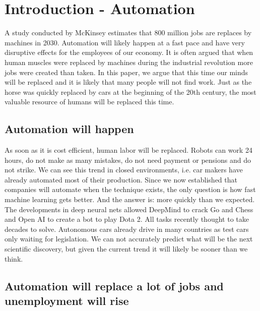 \documentclass[conference]{IEEEtran}
\begin{document}
\section{Introduction - Automation}
%
A study conducted by McKinsey \cite{AutomationMcKinsey} estimates that 800 million jobs are replaces by machines in 2030. Automation will likely happen at a fast pace and have very disruptive effects for the employees of our economy. It is often argued that when human muscles were replaced by machines during the industrial revolution more jobs were created than taken. In this paper, we argue that this time our minds will be replaced and it is likely that many people will not find work. Just as the horse was quickly replaced by cars at the beginning of the 20th century, the most valuable resource of humans will be replaced this time. 

\subsection{Automation will happen}

As soon as it is cost efficient, human labor will be replaced. Robots can work 24 hours, do not make as many mistakes, do not need payment or pensions and do not strike. We can see this trend in closed environments, i.e. car makers have already automated most of their production. Since we now established that companies will automate when the technique exists, the only question is how fast machine learning gets better. And the answer is: more quickly than we expected. The developments in deep neural nets allowed DeepMind to crack Go and Chess and Open AI to create a bot to play Dota 2. All tasks recently thought to take decades to solve. Autonomous cars already drive in many countries as test cars only waiting for legislation. We can not accurately predict what will be the next scientific discovery, but given the current trend it will likely be sooner than we think. 

\subsection{Automation will replace a lot of jobs and unemployment will rise}
\end{document}
